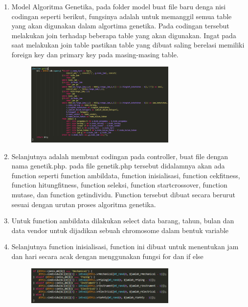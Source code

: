 \begin{enumerate}
    \item Model Algoritma Genetika, pada folder model buat file baru denga nisi codingan seperti berikut, fungsinya adalah untuk memanggil semua table yang akan digunakan dalam algortima genetika. Pada codingan tersebut melakukan join terhadap beberapa table yang akan digunakan. Ingat pada saat melakukan join table pastikan table yang dibuat saling berelasi memiliki foreign key dan primary key pada masing-masing table.
		\begin{figure}[!htbp]
    		\centering
    		\includegraphics[width=0.7\textwidth]{figures/GA1.PNG}
    		\label{GA1}
		\end{figure}
		
	\item Selanjutnya adalah membuat codingan pada controller, buat file dengan nama genetik.php. pada file genetik.php tersebut didalamnya akan ada function seperti function ambildata, function inisialisasi, function cekfitness, function hitungfitness, function seleksi, function startcrossover, function mutase, dan function getindividu. Function tersebut dibuat secara berurut sesuai dengan urutan proses algoritma genetika.
	
	\item Untuk function ambildata dilakukan select data barang, tahun, bulan dan data vendor untuk dijadikan sebuah chromosome dalam bentuk variable
	
	\item Selanjutnya function inisialisasi, function ini dibuat untuk menentukan jam dan hari secara acak dengan menggunakan fungsi for dan if else
		\begin{figure}[!htbp]
    		\centering
    		\includegraphics[width=0.7\textwidth]{figures/GA2.PNG}
    		\label{GA2}
		\end{figure}
	

\end{enumerate}
